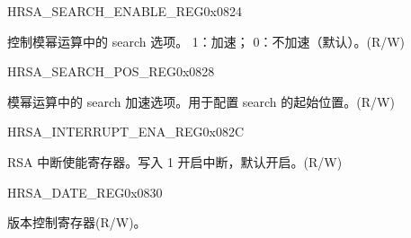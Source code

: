 \begin{register}{H}{RSA\_SEARCH\_ENABLE\_REG}{0x0824}\label{regdesc:RSASEARCHENABLEREG}
%
%
\regnewline%
\begin{regdesc}\begin{reglist}
\item [RSA\_SEARCH\_ENABLE] 控制模幂运算中的 search 选项。
1：加速；
0：不加速（默认）。(R/W)
\end{reglist}\end{regdesc}
\end{register}



\begin{register}{H}{RSA\_SEARCH\_POS\_REG}{0x0828}\label{regdesc:RSASEARCHPOSREG}
%
%
\regnewline%
\begin{regdesc}\begin{reglist}
\item [RSA\_SEARCH\_POS] 模幂运算中的 search 加速选项。用于配置 search 的起始位置。(R/W)
\end{reglist}\end{regdesc}
\end{register}


\begin{register}{H}{RSA\_INTERRUPT\_ENA\_REG}{0x082C}\label{regdesc:RSAINTERRUPTENAREG}
%
%
\regnewline%
\begin{regdesc}\begin{reglist}
\item [RSA\_INTERRUPT\_ENA] RSA 中断使能寄存器。写入 1 开启中断，默认开启。(R/W)
\end{reglist}\end{regdesc}
\end{register}


\begin{register}{H}{RSA\_DATE\_REG}{0x0830}\label{regdesc:RSADATEREG}
%
%
\regnewline%
\begin{regdesc}\begin{reglist}
\item [RSA\_DATE] 版本控制寄存器(R/W)。
\end{reglist}\end{regdesc}
\end{register}
